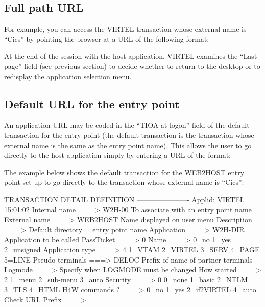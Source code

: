 \documentclass[letterpaper,10pt,english]{sphinxmanual}
\begin{document}
\subsection{Full path URL}
\label{\detokenize{User_Guide:full-path-url}}
For example, you can access the VIRTEL transaction whose external name is “Cics” by pointing the browser at a URL of
the following format:

\begin{sphinxVerbatim}[commandchars=\\\{\}]
\end{sphinxVerbatim}

At the end of the session with the host application, VIRTEL examines the “Last page” field (see previous section) to
decide whether to return to the desktop or to redisplay the application selection menu.


\subsection{Default URL for the entry point}
\label{\detokenize{User_Guide:default-url-for-the-entry-point}}
An application URL may be coded in the “TIOA at logon” field of the default transaction for the entry point (the default
transaction is the transaction whose external name is the same as the entry point name). This allows the user to go
directly to the host application simply by entering a URL of the format:

\begin{sphinxVerbatim}[commandchars=\\\{\}]
\end{sphinxVerbatim}

The example below shows the default transaction for the WEB2HOST entry point set up to go directly to the
transaction whose external name is “Cics”:

TRANSACTION DETAIL DEFINITION ———————- Applid: VIRTEL 15:01:02
Internal name    ===\textgreater{} W2H-00            To associate with an entry point name
External name    ===\textgreater{} WEB2HOST          Name displayed on user menu
Description      ===\textgreater{} Default directory = entry point name
Application      ===\textgreater{} W2H-DIR           Application to be called
PassTicket       ===\textgreater{} 0 Name ===\textgreater{}       0=no 1=yes 2=unsigned
Application type ===\textgreater{} 4                 1=VTAM 2=VIRTEL 3=SERV 4=PAGE 5=LINE
Pseudo-terminals ===\textgreater{} DELOC             Prefix of name of partner terminals
Logmode ===\textgreater{}                            Specify when LOGMODE must be changed
How started      ===\textgreater{} 2                 1=menu 2=sub-menu 3=auto
Security         ===\textgreater{} 0                 0=none 1=basic 2=NTLM 3=TLS 4=HTML
H4W commands ?   ===\textgreater{}                   0=no 1=yes 2=if2VIRTEL 4=auto
Check URL Prefix ===\textgreater{}
\end{document}
